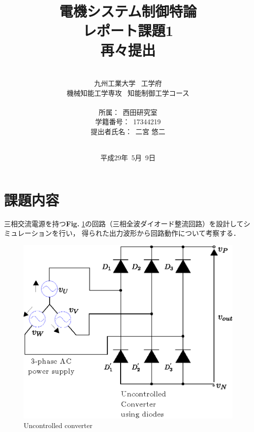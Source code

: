 \documentclass[a4paper,12pt]{jarticle}
\title{\Large{電機システム制御特論\\ レポート課題1\\ 再々提出}
}
\author{\vspace{70mm}\\
九州工業大学\ \hspace{0mm} 工学府\\
機械知能工学専攻\ \hspace{0mm} 知能制御工学コース\\
\\
所属：\ 西田研究室\\
学籍番号：\ 17344219\\
提出者氏名：\ 二宮 \hspace{0mm} 悠二\\\vspace{5mm}\\}
\date{平成29年\ 5月\ 9日}
\begin{document}
\titlepage
\maketitle
\thispagestyle{empty}
\newpage

\thispagestyle{empty}
\tableofcontents
\newpage

\section{課題内容}
三相交流電源を持つ{\bf Fig. }\ref{circuit}の回路（三相全波ダイオード整流回路）を設計してシミュレーションを行い，
得られた出力波形から回路動作について考察する．

\begin{figure}[b]
 \begin{center}
  \includegraphics[scale=0.9]{../figure/circuit.eps}
  \caption{Uncontrolled converter}
  \label{circuit}
 \end{center}
\end{figure}



\end{document}
